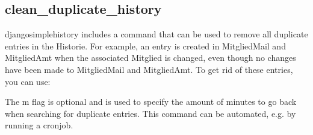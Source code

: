 \documentclass[letterpaper,10pt,english]{sphinxmanual}
\begin{document}
\subsection{clean\_duplicate\_history}
\label{\detokenize{masterCodeDoc:clean-duplicate-history}}
django\sphinxhyphen{}simple\sphinxhyphen{}history includes a command that can be used to remove all duplicate entries in the Historie.
For example, an entry is created in MitgliedMail and MitgliedAmt when the associated Mitglied is changed, even though no changes
have been made to MitgliedMail and MitgliedAmt. To get rid of these entries, you can use:


The \sphinxhyphen{}m flag is optional and is used to specify the amount of minutes to go back when searching for duplicate entries. This command can
be automated, e.g. by running a cronjob.
\end{document}
